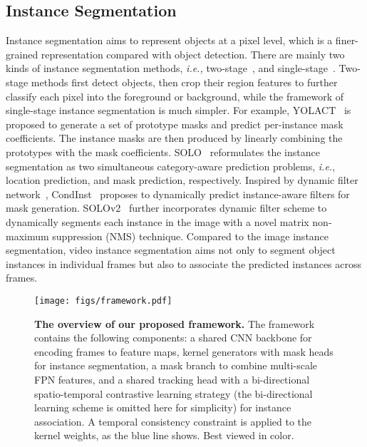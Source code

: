 \documentclass[runningheads]{llncs}
\begin{document}
\subsection{Instance Segmentation}
Instance segmentation aims to represent objects at a pixel level, which is a finer-grained representation compared with object detection. There are mainly two kinds of instance segmentation methods, {\em i.e.,} two-stage~\cite{he2017mask,liu2018path,huang2019mask}, and single-stage~\cite{chen2020blendmask,bolya2019yolact,wang2020solo,wang2020solov2,tian2020conditional}. Two-stage methods first detect objects, then crop their region features to further classify each pixel into the foreground or background, while the framework of single-stage instance segmentation is much simpler. For example, YOLACT~\cite{bolya2019yolact} is proposed to generate a set of prototype masks and predict per-instance mask coefficients. The instance masks are then produced by linearly combining the prototypes with the mask coefficients. SOLO~\cite{wang2020solo,wang2020solov2} reformulates the instance segmentation as two simultaneous category-aware prediction problems, \emph{i.e.}, location prediction, and mask prediction, respectively. Inspired by dynamic filter network~\cite{jia2016dynamic}, CondInst~\cite{tian2020conditional} proposes to dynamically predict instance-aware filters for mask generation. SOLOv2~\cite{wang2020solov2} further incorporates dynamic filter scheme to dynamically segments each instance in the image with a novel matrix non-maximum suppression (NMS) technique. Compared to the image instance segmentation, video instance segmentation aims not only to segment object instances in individual frames but also to associate the predicted instances across frames.


\begin{figure*}[t]
\centering
\texttt{[image: figs/framework.pdf]}
\caption{\textbf{The overview of our proposed framework.} The framework contains the following components: a shared CNN backbone for encoding frames to feature maps, kernel generators with mask heads for instance segmentation, a mask branch to combine multi-scale FPN features, and a shared tracking head with a bi-directional spatio-temporal contrastive learning strategy (the bi-directional learning scheme is omitted here for simplicity) for instance association. A temporal consistency constraint is applied to the kernel weights, as the blue line shows. Best viewed in color.}
\label{framework}
\end{figure*}
\end{document}
